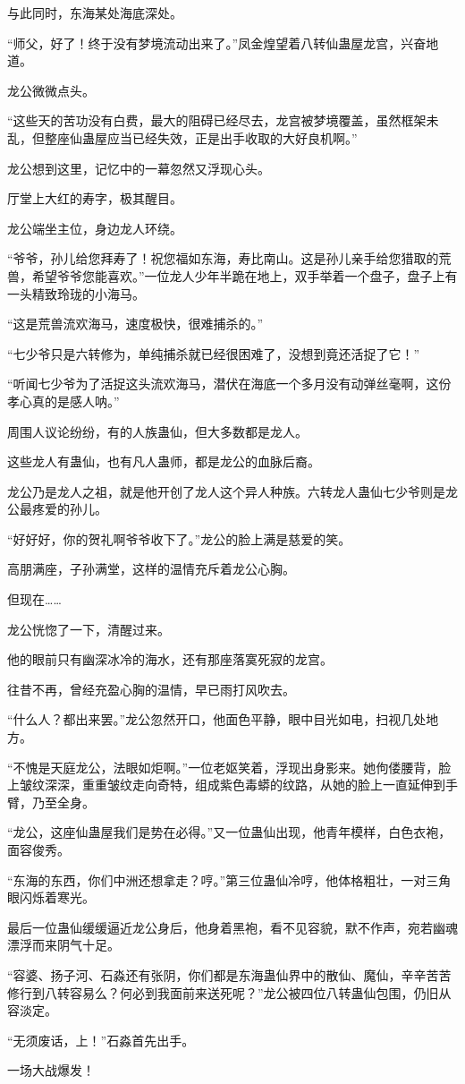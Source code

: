\begin{this_body}
与此同时，东海某处海底深处。

“师父，好了！终于没有梦境流动出来了。”凤金煌望着八转仙蛊屋龙宫，兴奋地道。

龙公微微点头。

“这些天的苦功没有白费，最大的阻碍已经尽去，龙宫被梦境覆盖，虽然框架未乱，但整座仙蛊屋应当已经失效，正是出手收取的大好良机啊。”

龙公想到这里，记忆中的一幕忽然又浮现心头。

厅堂上大红的寿字，极其醒目。

龙公端坐主位，身边龙人环绕。

“爷爷，孙儿给您拜寿了！祝您福如东海，寿比南山。这是孙儿亲手给您猎取的荒兽，希望爷爷您能喜欢。”一位龙人少年半跪在地上，双手举着一个盘子，盘子上有一头精致玲珑的小海马。

“这是荒兽流欢海马，速度极快，很难捕杀的。”

“七少爷只是六转修为，单纯捕杀就已经很困难了，没想到竟还活捉了它！”

“听闻七少爷为了活捉这头流欢海马，潜伏在海底一个多月没有动弹丝毫啊，这份孝心真的是感人呐。”

周围人议论纷纷，有的人族蛊仙，但大多数都是龙人。

这些龙人有蛊仙，也有凡人蛊师，都是龙公的血脉后裔。

龙公乃是龙人之祖，就是他开创了龙人这个异人种族。六转龙人蛊仙七少爷则是龙公最疼爱的孙儿。

“好好好，你的贺礼啊爷爷收下了。”龙公的脸上满是慈爱的笑。

高朋满座，子孙满堂，这样的温情充斥着龙公心胸。

但现在……

龙公恍惚了一下，清醒过来。

他的眼前只有幽深冰冷的海水，还有那座落寞死寂的龙宫。

往昔不再，曾经充盈心胸的温情，早已雨打风吹去。

“什么人？都出来罢。”龙公忽然开口，他面色平静，眼中目光如电，扫视几处地方。

“不愧是天庭龙公，法眼如炬啊。”一位老妪笑着，浮现出身影来。她佝偻腰背，脸上皱纹深深，重重皱纹走向奇特，组成紫色毒蟒的纹路，从她的脸上一直延伸到手臂，乃至全身。

“龙公，这座仙蛊屋我们是势在必得。”又一位蛊仙出现，他青年模样，白色衣袍，面容俊秀。

“东海的东西，你们中洲还想拿走？哼。”第三位蛊仙冷哼，他体格粗壮，一对三角眼闪烁着寒光。

最后一位蛊仙缓缓逼近龙公身后，他身着黑袍，看不见容貌，默不作声，宛若幽魂漂浮而来阴气十足。

“容婆、扬子河、石淼还有张阴，你们都是东海蛊仙界中的散仙、魔仙，辛辛苦苦修行到八转容易么？何必到我面前来送死呢？”龙公被四位八转蛊仙包围，仍旧从容淡定。

“无须废话，上！”石淼首先出手。

一场大战爆发！

\end{this_body}

